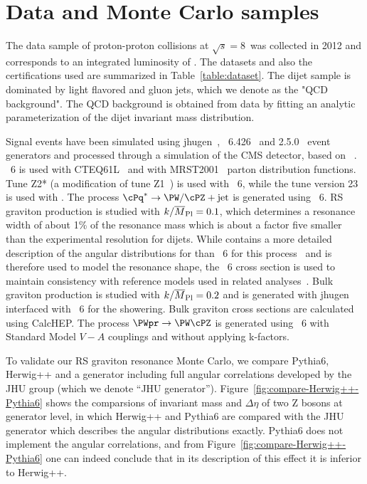 \newpage
\section{Data and Monte Carlo samples}
\label{sec:data_and_mc_samples}


The data sample of proton-proton collisions at $\sqrt{s}=8$~\TeVcc was collected in 2012 and corresponds to
an integrated luminosity of \intlumi.
The datasets and also the certifications
used are summarized in Table~\ref{table:dataset}. 
The dijet sample is dominated by light flavored and gluon jets, which we denote as 
the "QCD background".  The QCD background is obtained from data by fitting an
analytic parameterization of the dijet invariant mass distribution.

Signal events have been simulated using
{\sc jhugen}~\cite{Gao:2010qx,Bolognesi:2012mm},
\PYTHIA~6.426~\cite{pythia} and \HERWIG{++} 2.5.0~\cite{herwig} event
generators and processed through a simulation of the CMS detector,
based on \GEANTfour~\cite{refGEANT}.  \PYTHIA~6 is used with
CTEQ61L~\cite{cteq} and \HERWIG{++} with MRST2001~\cite{mrst} parton
distribution functions.  Tune Z2* (a modification of tune
Z1~\cite{bib_tunez1}) is used with \PYTHIA~6, while the tune version
23 is used with \HERWIG{++}.  The process $\cPq^* \to \PW/\cPZ +
\text{jet}$ is generated using \PYTHIA~6.  RS graviton production is
studied with $k/\overline{M}_\text{Pl}=0.1$, which determines a resonance width of about
1\% of the resonance mass which is about a factor five smaller than
the experimental resolution for dijets.  While \HERWIG{++} contains a
more detailed description of the angular distributions for \GRS than
\PYTHIA~6 for this process~\cite{resonanceshape} and is therefore used
to model the \GRS resonance shape, the \PYTHIA~6 cross section is used
to maintain consistency with reference models used in related
analyses~\cite{CMSZZPAS2}.  Bulk graviton production is studied with
$k/\overline{M}_\text{Pl}=0.2$ and is generated with {\sc jhugen} interfaced with
\PYTHIA~6 for the showering.
Bulk graviton cross sections are calculated using CalcHEP.
The process $\PWpr \to \PW\cPZ$ is generated using \PYTHIA~6 with Standard
Model $V-A$ couplings and without applying k-factors.  

To validate our RS graviton resonance Monte Carlo, we compare Pythia6, Herwig++ and 
a generator including full angular correlations developed by the JHU group (which
we denote ``JHU generator'').
Figure~\ref{fig:compare-Herwig++-Pythia6} shows the comparsions of invariant mass and
$\Delta\eta$ of two Z bosons at generator level, in which Herwig++ and
Pythia6 are compared with the JHU generator which describes the
angular distributions exactly.  Pythia6 does not implement the angular
correlations, and from Figure~\ref{fig:compare-Herwig++-Pythia6} one can indeed conclude
that in its description of this effect it is inferior to Herwig++.

